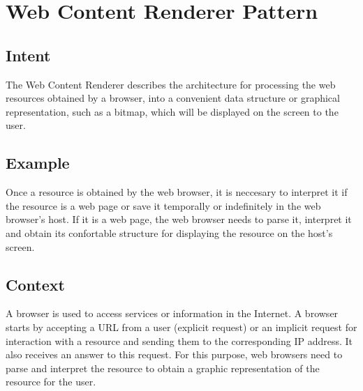\documentclass[prodmode,acmtecs]{acmsmall}
\begin{document}
\section{Web Content Renderer Pattern}

  \subsection*{Intent}

  The Web Content Renderer describes the architecture for processing the web resources obtained by a browser, into a convenient data structure \cite{gpuchrome} or graphical representation, such as a bitmap, which will be displayed on the screen to the user.

  \subsection*{Example}
  Once a resource is obtained by the web browser, it is neccesary to interpret it if the resource is a web page or save it temporally or indefinitely in the web browser's host. If it is a web page, the web browser needs to parse it, interpret it and obtain its confortable structure for displaying the resource on the host's screen.
  
  \subsection*{Context}
  A browser is used to access services or information in the Internet. A browser starts by accepting a URL from a user (explicit request) or an implicit request for interaction with a resource and sending them to the corresponding IP address. It also receives an answer to this request. For this purpose, web browsers need to parse and interpret the resource to obtain a graphic representation of the resource for the user.
\end{document}
